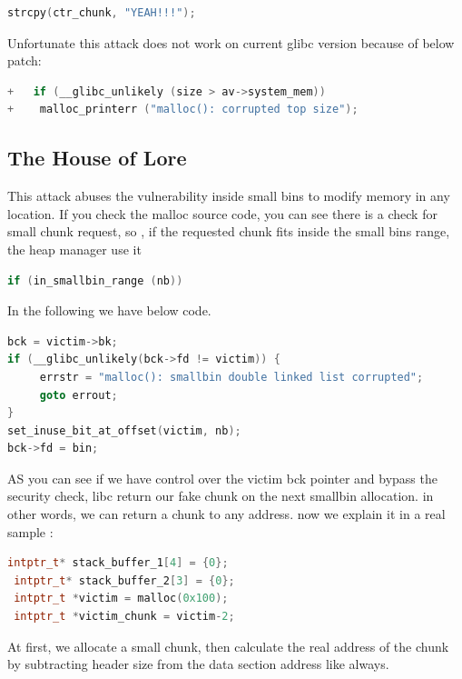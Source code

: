 \documentclass{masterthesis}
\newcommand*\libc{glibc}
\newcommand*\sbs{small bins}
\begin{document}
\begin{lstlisting}[language=c,frame=tlrb]
strcpy(ctr_chunk, "YEAH!!!");
\end{lstlisting}

Unfortunate this attack does not work on current \libc{} version because of below patch:
\begin{lstlisting}[language=c,frame=tlrb]
+   if (__glibc_unlikely (size > av->system_mem))
+    malloc_printerr ("malloc(): corrupted top size");
\end{lstlisting}

\subsection{The House of Lore}

This attack abuses the vulnerability inside \sbs{} to modify memory in any location. If you check the malloc source code, you can see there is a check for small chunk request, so , if the requested chunk fits inside the \sbs{} range, the heap manager use it 

\begin{lstlisting}[language=c,frame=tlrb]
if (in_smallbin_range (nb))
\end{lstlisting}

In the following we have below code.

\begin{lstlisting}[language=c,frame=tlrb]
bck = victim->bk;
if (__glibc_unlikely(bck->fd != victim)) {
	 errstr = "malloc(): smallbin double linked list corrupted";
	 goto errout;
}
set_inuse_bit_at_offset(victim, nb);
bck->fd = bin;
\end{lstlisting}

AS you can see if we have control over the victim bck pointer and bypass the security check, libc return our fake chunk on the next smallbin allocation. in other words, we can return a chunk to any address. now we explain it in a real sample :

\begin{lstlisting}[language=c,frame=tlrb]
 intptr_t* stack_buffer_1[4] = {0};
 intptr_t* stack_buffer_2[3] = {0};
 intptr_t *victim = malloc(0x100);
 intptr_t *victim_chunk = victim-2;
\end{lstlisting}

At first, we allocate a small chunk, then calculate the real address of the chunk by subtracting header size from the data section address like always.
\end{document}
